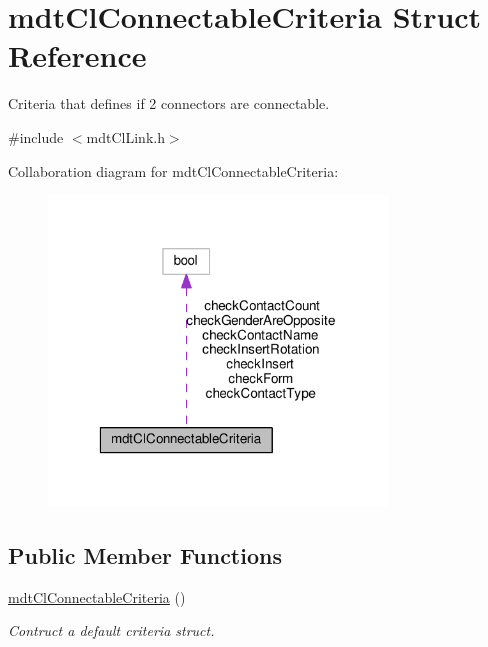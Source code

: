 \hypertarget{structmdt_cl_connectable_criteria}{\section{mdt\-Cl\-Connectable\-Criteria Struct Reference}
\label{structmdt_cl_connectable_criteria}
}


Criteria that defines if 2 connectors are connectable.  




{\ttfamily \#include $<$mdt\-Cl\-Link.\-h$>$}



Collaboration diagram for mdt\-Cl\-Connectable\-Criteria\-:\nopagebreak
\begin{figure}[H]
\begin{center}
\leavevmode
\includegraphics[width=256pt]{structmdt_cl_connectable_criteria__coll__graph}
\end{center}
\end{figure}
\subsection*{Public Member Functions}
\begin{DoxyCompactItemize}
\item 
\hyperlink{structmdt_cl_connectable_criteria_a4b1714ec82d4ff747c685b223f94e870}{mdt\-Cl\-Connectable\-Criteria} ()
\begin{DoxyCompactList}\small\item\em Contruct a default criteria struct. \end{DoxyCompactList}\end{DoxyCompactItemize}
